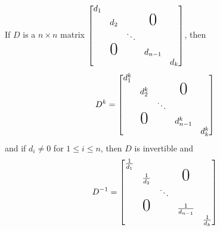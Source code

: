 \documentclass[12pt]{article}
\begin{document}
If $D$ is a $ n \times n$ matrix $ \begin{bmatrix} d_1\\ & d_2 & & \text{\huge0}\\ & & \ddots \\ & \text{\huge0} & & d_{n - 1} \\ & & & & d_k \end{bmatrix} $, then $$ D^k = \begin{bmatrix} d_1^k\\ & d_2^k & & \text{\huge0}\\ & & \ddots \\ & \text{\huge0} & & d_{n - 1}^k \\ & & & & d_k^k \end{bmatrix} $$ and if $d_i \neq 0$ for $ 1 \leq i \leq n$, then $D$ is invertible and $$D^{-1} = \begin{bmatrix} \frac{1}{d_1} \\ & \frac{1}{d_2} & & \text{\huge0}\\ & & \ddots \\ & \text{\huge0} & & \frac{1}{d_{n - 1}} \\ & & & & \frac{1}{d_k} \end{bmatrix} $$ 
\end{document}
